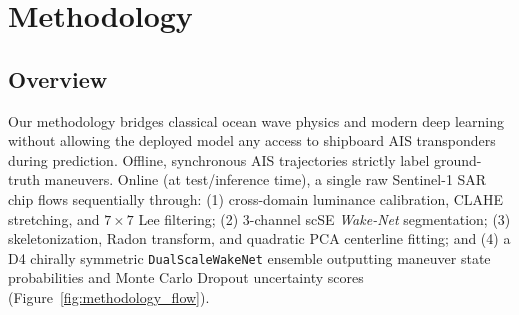 \documentclass[11pt,a4paper]{article}
\begin{document}
\section{Methodology}

\subsection{Overview}
Our methodology bridges classical ocean wave physics and modern deep learning without allowing the deployed model any access to shipboard AIS transponders during prediction. Offline, synchronous AIS trajectories strictly label ground-truth maneuvers. Online (at test/inference time), a single raw Sentinel-1 SAR chip flows sequentially through: (1) cross-domain luminance calibration, CLAHE stretching, and $7\times 7$ Lee filtering; (2) 3-channel scSE \textit{Wake-Net} segmentation; (3) skeletonization, Radon transform, and quadratic PCA centerline fitting; and (4) a D4 chirally symmetric \texttt{DualScaleWakeNet} ensemble outputting maneuver state probabilities and Monte Carlo Dropout uncertainty scores (Figure~\ref{fig:methodology_flow}).
\end{document}
